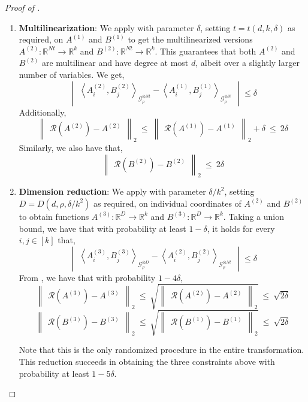 \documentclass[11pt]{article}
\newcommand{\inangle}[1]{\left \langle #1 \right \rangle}
\newcommand{\inabs}[1]{\begin{vmatrix} #1 \end{vmatrix}}
\newcommand{\norm}[2]{\begin{Vmatrix} #2 \end{Vmatrix}_{#1}}
\newcommand{\sAND}{\ \mathrm{and} \ }
\newcommand{\eps}{\varepsilon}
\newcommand{\bbR}{{\mathbb R}}
\newcommand{\calG}{\mathcal{G}}
\newcommand{\calR}{\mathcal{R}}
\begin{document}
\begin{proof}[Proof of ]
\begin{enumerate}
	\item {\bf Multilinearization}: We apply  with parameter $\delta$, setting $t = t(d, k, \delta)$ as required, on $A^{(1)}$ and $B^{(1)}$ to get the multilinearized versions $A^{(2)} : \bbR^{Nt} \to \bbR^k$ and $B^{(2)} : \bbR^{Nt} \to \bbR^k$. This guarantees that both $A^{(2)}$ and $B^{(2)}$ are multilinear and have degree at most $d$, albeit over a slightly larger number of variables. We get,
	\begin{equation}
	\inabs{\inangle{A^{(2)}_i, B^{(2)}_j}_{\calG_\rho^{\otimes Nt}} - \inangle{A^{(1)}_i, B^{(1)}_j}_{\calG_\rho^{\otimes N}}} \le \delta \label{eqn:GNIS-2}
	\end{equation}
	Additionally,
	\[ \norm{2}{\calR(A^{(2)}) - A^{(2)}} ~\le~ \norm{2}{\calR(A^{(1)}) - A^{(1)}} + \delta ~\le~ 2\delta\]
	Similarly, we also have that,
	\[ \norm{2}{\calR(B^{(2)}) - B^{(2)}} ~\le~ 2 \delta\]
	
	\item {\bf Dimension reduction}: We apply  with parameter $\delta/k^2$, setting $D = D(d, \rho, \delta/k^2)$ as required, on individual coordinates of $A^{(2)}$ and $B^{(2)}$ to obtain functions $A^{(3)} : \bbR^D \to \bbR^k$ and $B^{(3)} : \bbR^D \to \bbR^k$. Taking a union bound, we have that with probability at least $1-\delta$, it holds for every $i, j \in [k]$ that, %
	\begin{equation}
	\inabs{\inangle{A^{(3)}_i, B^{(3)}_j}_{\calG_\rho^{\otimes D}} - \inangle{A^{(2)}_i, B^{(2)}_j}_{\calG_\rho^{\otimes Nt}}} \le \delta \label{eqn:GNIS-3}
	\end{equation}
	From , we have that with probability $1-4\delta$,
	\[ \norm{2}{\calR(A^{(3)}) - A^{(3)}} ~\le~ \sqrt{\norm{2}{\calR(A^{(2)}) - A^{(2)}}} ~\le~ \sqrt{2\delta}\]
	\[\norm{2}{\calR(B^{(3)}) - B^{(3)}} ~\le~ \sqrt{\norm{2}{\calR(B^{(1)}) - B^{(1)}}} ~\le~ \sqrt{2\delta}\]
	
	Note that this is the only randomized procedure in the entire transformation. This reduction succeeds in obtaining the three constraints above with probability at least $1 - 5\delta$.
	

\end{enumerate}
\end{proof}
\end{document}
